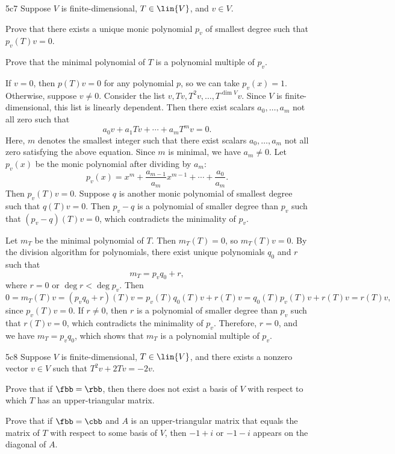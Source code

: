 \begin{exercise}{5c7}
    Suppose $V$ is finite-dimensional, $T \in \lin{V}$, and $v \in V$.
    \begin{subexercises}
        \item Prove that there exists a unique monic polynomial $p_v$ of smallest degree such that $p_v(T)v = 0$.
        \item Prove that the minimal polynomial of $T$ is a polynomial multiple of $p_v$.
    \end{subexercises}
\end{exercise}

\begin{solenum}
    \item If $v = 0$, then $p(T)v = 0$ for any polynomial $p$, so we can take $p_v(x) = 1$.
    Otherwise, suppose $v \neq 0$.
    Consider the list $v, Tv, T^2v, \ldots, T^{\dim V}v$.
    Since $V$ is finite-dimensional, this list is linearly dependent.
    Then there exist scalars $a_0, \ldots, a_m$ not all zero such that
    \[
        a_0v + a_1Tv + \cdots + a_mT^mv = 0.
    \]
    Here, $m$ denotes the smallest integer such that there exist scalars $a_0, \ldots, a_m$ not all zero satisfying the above equation.
    Since $m$ is minimal, we have $a_m \neq 0$.
    Let $p_v(x)$ be the monic polynomial after dividing by $a_m$:
    \[
        p_v(x) = x^m + \frac{a_{m-1}}{a_m}x^{m-1} + \cdots + \frac{a_0}{a_m}.
    \]
    Then $p_v(T)v = 0$.
    Suppose $q$ is another monic polynomial of smallest degree such that $q(T)v = 0$.
    Then $p_v - q$ is a polynomial of smaller degree than $p_v$ such that $(p_v - q)(T)v = 0$, which contradicts the minimality of $p_v$.
    \item Let $m_T$ be the minimal polynomial of $T$.
    Then $m_T(T) = 0$, so $m_T(T)v = 0$.
    By the division algorithm for polynomials, there exist unique polynomials $q_0$ and $r$ such that
    \[
        m_T = p_vq_0 + r,
    \]
    where $r = 0$ or $\deg r < \deg p_v$.
    Then
    \[
        0 = m_T(T)v = (p_vq_0 + r)(T)v = p_v(T)q_0(T)v + r(T)v = q_0(T)p_v(T)v + r(T)v = r(T)v,
    \]
    since $p_v(T)v = 0$.
    If $r \neq 0$, then $r$ is a polynomial of smaller degree than $p_v$ such that $r(T)v = 0$, which contradicts the minimality of $p_v$.
    Therefore, $r = 0$, and we have $m_T = p_vq_0$, which shows that $m_T$ is a polynomial multiple of $p_v$.
\end{solenum}

\begin{exercise}{5c8}
    Suppose $V$ is finite-dimensional, $T \in \lin{V}$, and there exists a nonzero vector $v \in V$ such that $T^2v + 2Tv = -2v$.
    \begin{subexercises}
        \item Prove that if $\fbb = \rbb$, then there does not exist a basis of $V$ with respect to which $T$ has an upper-triangular matrix.
        \item Prove that if $\fbb = \cbb$ and $A$ is an upper-triangular matrix that equals the matrix of $T$ with respect to some basis of $V$, then $-1 + i$ or $-1 - i$ appears on the diagonal of $A$.
    \end{subexercises}
\end{exercise}

